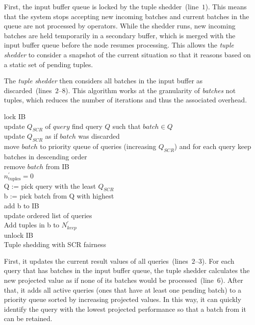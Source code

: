 First, the input buffer queue is locked by the tuple shedder~(line~$1$). This means that the system stops
accepting new incoming batches and current batches in the queue are not processed by operators. While the
shedder runs, new incoming batches are held temporarily in a secondary buffer, which is merged with the
input buffer queue before the node resumes processing. This allows the \emph{tuple shedder} to consider a
snapshot of the current situation so that it reasons based on a static set of pending tuples.

The \emph{tuple shedder} then considers all batches in the input buffer as discarded~(lines~$2$--$8$). 
This algorithm works at the granularity of \emph{batches} not tuples, which reduces the number of
iterations and thus the associated overhead.

\begin{algorithm}[b!] 

        lock IB\\
	{
		update $Q_{SCR}$ of $query$
	}
        {
		find query $Q$ such that $batch \in Q$ \\
		update ${Q}_{SCR}$ as if $batch$ was discarded \\
  		move $batch$ to priority queue of queries (increasing ${Q}_{SCR}$) and for each query keep batches in
  		descending \sic order\\
		remove $batch$ from IB\\
        }
	$n_{\mathrm{tuples}}^{\prime} = 0$\\
         {
                Q := pick query with the least ${Q}_{SCR}$ \\
                b := pick batch from Q with highest \sic \\
        	add b to IB\\
		update ordered list of queries\\
		Add tuples in b to $N_{keep}^{\prime}$ \\
        }
        unlock IB\\
\caption{Tuple shedding with SCR fairness}
\label{alg:distributedFairness}
\end{algorithm}

First, it updates the current result \sic values of all queries~(lines~$2$--$3$). 
For each query that has batches in the input buffer queue, the tuple shedder calculates the new projected
\sic value as if none of its batches would be processed~(line~$6$).
After that, it adds all active queries (\ie ones that have at least one pending batch) to a priority
queue sorted by increasing projected \sic values. In this way, it can quickly identify the query with
the lowest projected performance so that a batch from it can be retained.

